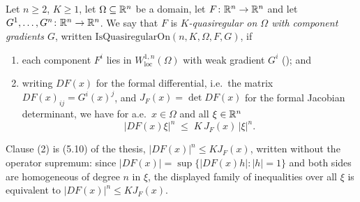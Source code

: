 \begin{definition}
Let $n\ge2$, $K\ge1$, let $\Omega\subseteq\mathbb{R}^n$ be a domain, let
$F\colon\mathbb{R}^n\to\mathbb{R}^n$ and let $G^1,\dots,G^n\colon\mathbb{R}^n\to\mathbb{R}^n$.  We say that $F$
is \emph{$K$-quasiregular on $\Omega$ with component gradients $G$}, written
$\mathrm{IsQuasiregularOn}(n,K,\Omega,F,G)$, if
\begin{enumerate}
\item each component $F^i$ lies in $W^{1,n}_{\mathrm{loc}}(\Omega)$ with weak
  gradient $G^i$ (); and
\item writing $DF(x)$ for the formal differential, i.e.\ the matrix
  $DF(x)_{ij}=G^i(x)^j$, and $J_F(x)=\det DF(x)$ for the formal Jacobian
  determinant, we have for a.e.\ $x\in\Omega$ and all $\xi\in\mathbb{R}^n$
\[
|DF(x)\xi|^n\;\le\;K\,J_F(x)\,|\xi|^n .
\]
\end{enumerate}
Clause (2) is (5.10) of the thesis, $|DF(x)|^n\le KJ_F(x)$, written without the
operator supremum: since $|DF(x)|=\sup\{|DF(x)h|:|h|=1\}$ and both sides are
homogeneous of degree $n$ in $\xi$, the displayed family of inequalities over
all $\xi$ is equivalent to $|DF(x)|^n\le KJ_F(x)$.
\end{definition}
